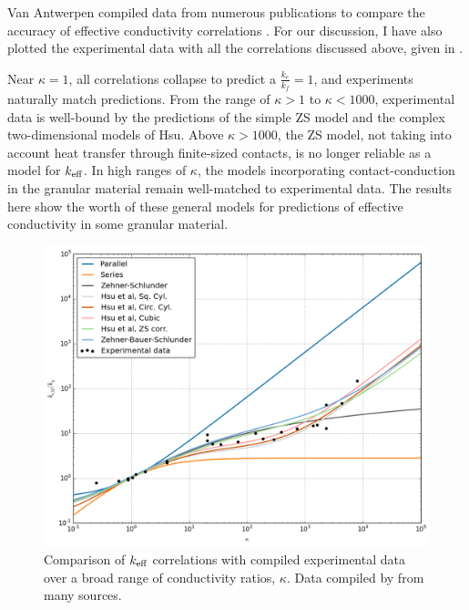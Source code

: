 Van Antwerpen compiled data from numerous publications to compare the accuracy of effective conductivity correlations \cite{VanAntwerpen2010}. For our discussion, I have also plotted the experimental data with all the correlations discussed above, given in .

Near $\kappa = 1$, all correlations collapse to predict a $\frac{k_e}{k_f} = 1$, and experiments naturally match predictions. From the range of $\kappa > 1$ to $\kappa <1000$, experimental data is well-bound by the predictions of the simple ZS model and the complex two-dimensional models of Hsu\etal. Above $\kappa > 1000$, the ZS model, not taking into account heat transfer through finite-sized contacts, is no longer reliable as a model for $k_\text{eff}$. In high ranges of $\kappa$, the models incorporating contact-conduction in the granular material remain well-matched to experimental data. The results here show the worth of these general models for predictions of effective conductivity in some granular material.

\begin{figure}[!h]
    \centering
    \includegraphics[width=\singleimagewidth]{figures/keff-kappa-experimental}
    \caption{Comparison of $k_\text{eff}$ correlations with compiled experimental data over a broad range of conductivity ratios, $\kappa$. Data compiled by \cite{VanAntwerpen2010} from many sources.}
    \label{fig:kappa-experimental}
\end{figure}

